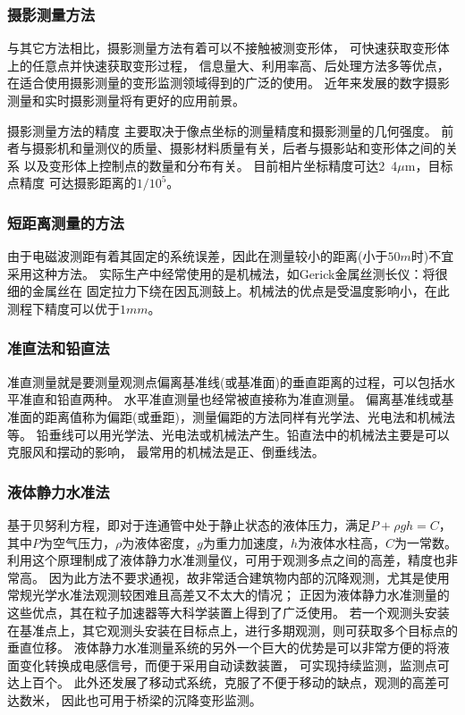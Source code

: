 \subsubsection*{摄影测量方法}
与其它方法相比，摄影测量方法有着可以不接触被测变形体，
可快速获取变形体上的任意点并快速获取变形过程，
信息量大、利用率高、后处理方法多等优点，
在适合使用摄影测量的变形监测领域得到的广泛的使用。
近年来发展的数字摄影测量和实时摄影测量将有更好的应用前景。

摄影测量方法的精度
主要取决于像点坐标的测量精度和摄影测量的几何强度。
前者与摄影机和量测仪的质量、摄影材料质量有关，后者与摄影站和变形体之间的关系
以及变形体上控制点的数量和分布有关。
目前相片坐标精度可达2~4${\mu}$m，目标点精度
可达摄影距离的${1/10^5}$。
\subsubsection*{短距离测量的方法}
由于电磁波测距有着其固定的系统误差，因此在测量较小的距离(小于$50m$时)不宜采用这种方法。
实际生产中经常使用的是机械法，如Gerick金属丝测长仪：将很细的金属丝在
固定拉力下绕在因瓦测鼓上。机械法的优点是受温度影响小，在此测程下精度可以优于$1mm$。
\subsubsection*{准直法和铅直法}
准直测量就是要测量观测点偏离基准线(或基准面)的垂直距离的过程，可以包括水平准直和铅直两种。
水平准直测量也经常被直接称为准直测量。
偏离基准线或基准面的距离值称为偏距(或垂距)，测量偏距的方法同样有光学法、光电法和机械法等。
铅垂线可以用光学法、光电法或机械法产生。铅直法中的机械法主要是可以克服风和摆动的影响，
最常用的机械法是正、倒垂线法。
\subsubsection*{液体静力水准法}
基于贝努利方程，即对于连通管中处于静止状态的液体压力，满足$P+{\rho}gh=C$，
其中$P$为空气压力，$\rho$为液体密度，$g$为重力加速度，$h$为液体水柱高，$C$为一常数。
利用这个原理制成了液体静力水准测量仪，可用于观测多点之间的高差，精度也非常高。
因为此方法不要求通视，故非常适合建筑物内部的沉降观测，尤其是使用常规光学水准法观测较困难且高差又不太大的情况；
正因为液体静力水准测量的这些优点，其在粒子加速器等大科学装置上得到了广泛使用。
若一个观测头安装在基准点上，其它观测头安装在目标点上，进行多期观测，则可获取多个目标点的垂直位移。
液体静力水准测量系统的另外一个巨大的优势是可以非常方便的将液面变化转换成电感信号，而便于采用自动读数装置，
可实现持续监测，监测点可达上百个。
此外还发展了移动式系统，克服了不便于移动的缺点，观测的高差可达数米，
因此也可用于桥梁的沉降变形监测。
